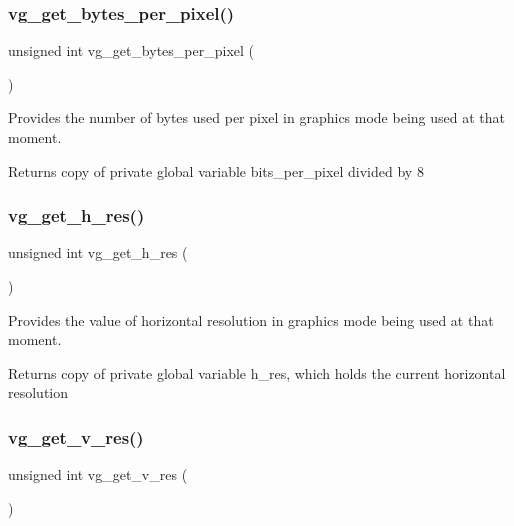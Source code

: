 \subsubsection{\texorpdfstring{vg\+\_\+get\+\_\+bytes\+\_\+per\+\_\+pixel()}{vg\_get\_bytes\_per\_pixel()}}
{\footnotesize\ttfamily unsigned int vg\+\_\+get\+\_\+bytes\+\_\+per\+\_\+pixel (\begin{DoxyParamCaption}{ }\end{DoxyParamCaption})}



Provides the number of bytes used per pixel in graphics mode being used at that moment. 

\begin{DoxyReturn}{Returns}
copy of private global variable bits\+\_\+per\+\_\+pixel divided by 8 
\end{DoxyReturn}
\hypertarget{group__video__gr_ga3fc3f07355f5cad0248d1c426f185d00}{}\label{group__video__gr_ga3fc3f07355f5cad0248d1c426f185d00} 
\subsubsection{\texorpdfstring{vg\+\_\+get\+\_\+h\+\_\+res()}{vg\_get\_h\_res()}}
{\footnotesize\ttfamily unsigned int vg\+\_\+get\+\_\+h\+\_\+res (\begin{DoxyParamCaption}{ }\end{DoxyParamCaption})}



Provides the value of horizontal resolution in graphics mode being used at that moment. 

\begin{DoxyReturn}{Returns}
copy of private global variable h\+\_\+res, which holds the current horizontal resolution 
\end{DoxyReturn}
\hypertarget{group__video__gr_ga90eacdd060b588a092805bfc9227a54e}{}\label{group__video__gr_ga90eacdd060b588a092805bfc9227a54e} 
\subsubsection{\texorpdfstring{vg\+\_\+get\+\_\+v\+\_\+res()}{vg\_get\_v\_res()}}
{\footnotesize\ttfamily unsigned int vg\+\_\+get\+\_\+v\+\_\+res (\begin{DoxyParamCaption}{ }\end{DoxyParamCaption})}



